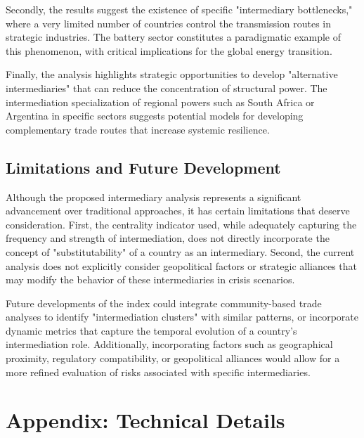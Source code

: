 \documentclass[final,1p,times,authoryear]{elsarticle}
\begin{document}
Secondly, the results suggest the existence of specific "intermediary bottlenecks," where a very limited number of countries control the transmission routes in strategic industries. The battery sector constitutes a paradigmatic example of this phenomenon, with critical implications for the global energy transition.

Finally, the analysis highlights strategic opportunities to develop "alternative intermediaries" that can reduce the concentration of structural power. The intermediation specialization of regional powers such as South Africa or Argentina in specific sectors suggests potential models for developing complementary trade routes that increase systemic resilience.

\subsection{Limitations and Future Development}

Although the proposed intermediary analysis represents a significant advancement over traditional approaches, it has certain limitations that deserve consideration. First, the centrality indicator used, while adequately capturing the frequency and strength of intermediation, does not directly incorporate the concept of "substitutability" of a country as an intermediary. Second, the current analysis does not explicitly consider geopolitical factors or strategic alliances that may modify the behavior of these intermediaries in crisis scenarios.

Future developments of the index could integrate community-based trade analyses to identify "intermediation clusters" with similar patterns, or incorporate dynamic metrics that capture the temporal evolution of a country's intermediation role. Additionally, incorporating factors such as geographical proximity, regulatory compatibility, or geopolitical alliances would allow for a more refined evaluation of risks associated with specific intermediaries.

\newpage
\appendix
\section{Appendix: Technical Details}
\end{document}
